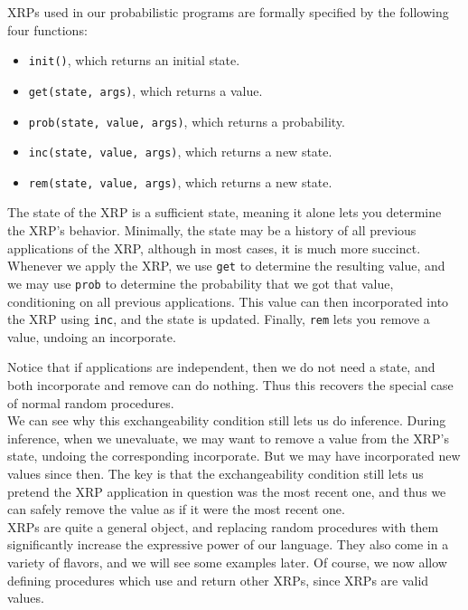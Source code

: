 \documentclass[11pt]{article}
\begin{document}
XRPs used in our probabilistic programs are formally specified by the following four functions:

\begin{itemize}
\item {\tt init()}, which returns an initial state.  
\item {\tt get(state, args)}, which returns a value.
\item {\tt prob(state, value, args)}, which returns a probability.
\item {\tt inc(state, value, args)}, which returns a new state.
\item {\tt rem(state, value, args)}, which returns a new state.
\end{itemize}

The state of the XRP is a sufficient state, meaning it alone lets you determine the XRP's behavior.  Minimally, the state may be a history of all previous applications of the XRP, although in most cases, it is much more succinct.  Whenever we apply the XRP, we use {\tt get} to determine the resulting value, and we may use {\tt prob} to determine the probability that we got that value, conditioning on all previous applications.  This value can then incorporated into the XRP using {\tt inc}, and the state is updated.  Finally, {\tt rem} lets you remove a value, undoing an incorporate.

Notice that if applications are independent, then we do not need a state, and both incorporate and remove can do nothing.  Thus this recovers the special case of normal random procedures.  \\

We can see why this exchangeability condition still lets us do inference.  During inference, when we unevaluate, we may want to remove a value from the XRP's state, undoing the corresponding incorporate.  But we may have incorporated new values since then.  The key is that the exchangeability condition still lets us pretend the XRP application in question was the most recent one, and thus we can safely remove the value as if it were the most recent one.  \\

XRPs are quite a general object, and replacing random procedures with them significantly increase the expressive power of our language.   They also come in a variety of flavors, and we will see some examples later.   Of course, we now allow defining procedures which use and return other XRPs, since XRPs are valid values.  \\
\end{document}
